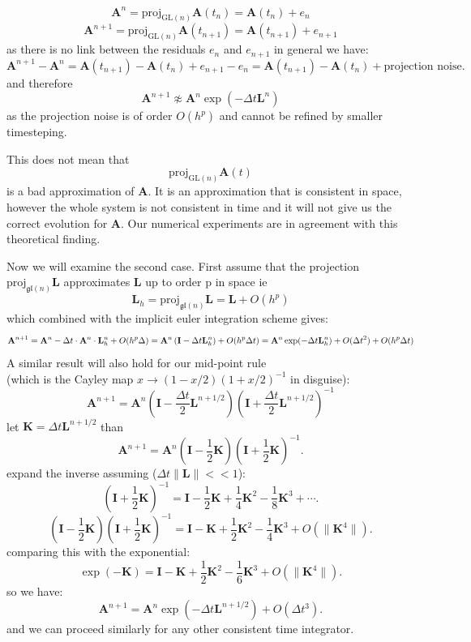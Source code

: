 \documentclass[oneside, a4paper, onecolumn, 11pt]{article}
\renewcommand{\AA}{\mathbf{A}}
\newcommand{\II}{\mathbf{I}}
\newcommand{\LL}{\mathbf{L}}
\newcommand{\proj}{\text{proj}}
\newcommand{\GL}{\mathrm{GL}(n)}%
\newcommand{\gl}{\mathfrak{gl}(n)}%
\newcommand{\KK}{\mathbf{K}}
\newcommand{\Dt}{\Delta t}
\begin{document}
\begin{section}
\begin{subsection}
\begin{subsection}
\begin{subsubsection}
    \[
        \AA^{n} = \proj_{\GL} \AA(t_{n}) = \AA(t_n) + e_n 
    \]
    \[
        \AA^{n+1} = \proj_{\GL} \AA(t_{n+1}) = \AA(t_{n+1}) + e_{n+1}
    \]
    as there is no link between the residuals $e_n$ and $e_{n+1}$ in general we have: 
    \[
        \AA^{n+1} - \AA^{n} = 
        \AA(t_{n+1}) - \AA(t_{n}) + e_{n+1} - e_{n} = 
        \AA(t_{n+1}) - \AA(t_{n}) + \text{projection noise} 
    .\] 
    and therefore
   \[
       \AA^{n+1} \not \approx \AA^{n} \exp(- \Delta t \LL^n)
    \]
    as the projection noise is of order $O(h^p)$ and cannot be refined by smaller
    timesteping.

    This does not mean that 
    \[
        \proj_{\GL} \AA(t)
    \] 
    is a bad approximation of $\AA$. It is an approximation that is
    consistent in space, however the whole system is not consistent
    in time and it will not give us the correct evolution for $\AA$.
    Our numerical experiments are in agreement with this
    theoretical finding.

    Now we will examine the second case.
    First assume that the projection $\proj_{\gl} \LL$ approximates
    $\LL$ up to order p in space ie
    \[
    \LL_{h} = \proj_{\gl} \LL = \LL + O(h^p) 
    \]  
    which combined with the implicit euler integration scheme
    gives:
    \[
       \AA^{n+1}= \AA^{n} - \Delta t \cdot \AA^{n} \cdot
       \LL_h^n + O(h^{p}\Delta) =
       \AA^{n} \left( \II - \Delta t \LL_h^n 
       \right) + O(h^{p}\Delta t) =\\
       \AA^{n} \exp( - \Delta t \LL_h^n) +
       O(\Delta t^2) + O(h^{p} \Delta t)
    \] 
    A similar result will also hold for our 
    mid-point rule\\ 
    (which is the Cayley map $x \rightarrow (1 - x/2)(1 + x/2)^{-1}$
     in disguise):
    \[
    \AA^{n+1} = \AA^{n} \left( \II - \frac{\Delta t}{2}
    \LL^{n+1/2}\right) \left( \II + \frac{\Delta t}{2}
    \LL^{n+1/2}\right)^{-1} 
    \] 
    let $\KK = \Dt \LL^{n+1/2}$ than
    \[
        \AA^{n+1} = \AA^{n}\left( \II - \frac{1}{2} \KK \right) 
        \left( \II + \frac{1}{2} \KK \right)^{-1} 
    .\] 
    expand the inverse assuming ($\Dt \|\LL\| << 1$):
    \[
        \left( \II + \frac{1}{2} \KK \right)^{-1} =
        \II - \frac{1}{2} \KK + \frac{1}{4} \KK^{2} -
        \frac{1}{8} \KK^{3}+ \cdots
    .\] 
    \[
        \left( \II - \frac{1}{2} \KK \right) 
        \left( \II + \frac{1}{2} \KK \right)^{-1} =
        \II - \KK + \frac{1}{2}\KK^{2} - 
        \frac{1}{4}\KK^{3} + O(\|\KK^4\|)
    .\] 
    comparing this with the exponential:
    \[
    \exp(-\KK) = \II - \KK + \frac{1}{2} \KK^{2} - 
    \frac{1}{6}\KK^{3} + O(\|\KK^4\|)
    .\] 
    so we have:
    \[
        \AA^{n+1} = \AA^{n} \exp(- \Dt \LL^{n+1/2}) + O(\Dt^3)
    .\] 
    and we can proceed similarly for any other
    consistent time integrator.


\end{subsubsection}
\end{subsection}
\end{subsection}
\end{section}
\end{document}
